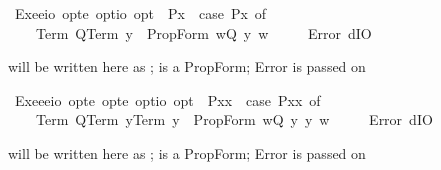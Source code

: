 \begin{isabellebody}
\begin{isamarkuptext}
\end{isamarkuptext}%
\isamarkuptrue%
\isamarkupfalse%
\ Exe{}{\isacharcolon}{\isacharcolon}{\isachardoublequoteopen}{\isacharparenleft}e{\isasymRightarrow}io{\isacharparenright}\ opt{\isasymRightarrow}e\ opt{\isasymRightarrow}io\ opt{\isachardoublequoteclose}\ \ {\isachardoublequoteopen}{\isacharless}P{\isasymbullet}x{\isachargreater}\ {\isasymequiv}\ case\ {\isacharparenleft}P{\isacharcomma}x{\isacharparenright}\ of\ \isanewline
\ \ \ \ {\isacharparenleft}Term\ Q{\isacharcomma}Term\ y{\isacharparenright}\ {\isasymRightarrow}\ PropForm\ {\isacharparenleft}{\isasymlambda}w{\isachardot}{\isacharparenleft}Q\ y{\isacharparenright}\ w{\isacharparenright}\isanewline
\ \ {\isacharbar}\ {\isacharunderscore}\ {\isasymRightarrow}\ Error\ dIO{\isachardoublequoteclose}%
\begin{isamarkuptext}%
  will be written here as ;  is a PropForm; Error is passed on%
\end{isamarkuptext}%
\isamarkuptrue%
\isamarkupfalse%
\ Exe{}{\isacharcolon}{\isacharcolon}{\isachardoublequoteopen}{\isacharparenleft}e{\isasymRightarrow}e{\isasymRightarrow}io{\isacharparenright}\ opt{\isasymRightarrow}e\ opt{\isasymRightarrow}e\ opt{\isasymRightarrow}io\ opt{\isachardoublequoteclose}\ \ {\isachardoublequoteopen}{\isacharless}P{\isasymbullet}x{}{\isacharcomma}x{}{\isachargreater}\ {\isasymequiv}\ case\ {\isacharparenleft}P{\isacharcomma}x{}{\isacharcomma}x{}{\isacharparenright}\ of\ \isanewline
\ \ \ \ {\isacharparenleft}Term\ Q{\isacharcomma}Term\ y{}{\isacharcomma}Term\ y{}{\isacharparenright}\ {\isasymRightarrow}\ PropForm\ {\isacharparenleft}{\isasymlambda}w{\isachardot}{\isacharparenleft}Q\ y{}\ y{}{\isacharparenright}\ w{\isacharparenright}\isanewline
\ \ {\isacharbar}\ {\isacharunderscore}\ {\isasymRightarrow}\ Error\ dIO{\isachardoublequoteclose}%
\begin{isamarkuptext}%
   will be written here as ;  is a PropForm; Error is passed on%

\end{isamarkuptext}
\end{isabellebody}
